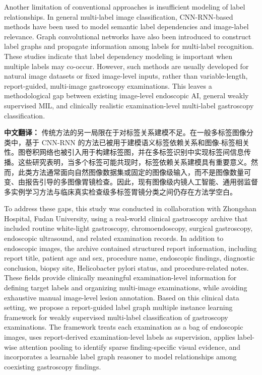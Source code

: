 \documentclass[Afour,sagev,times]{sagej}
\begin{document}
Another limitation of conventional approaches is insufficient modeling of label relationships. In general multi-label image classification, CNN-RNN-based methods have been used to model semantic label dependencies and image-label relevance.\cite{R14} Graph convolutional networks have also been introduced to construct label graphs and propagate information among labels for multi-label recognition.\cite{R15} These studies indicate that label dependency modeling is important when multiple labels may co-occur. However, such methods are usually developed for natural image datasets or fixed image-level inputs, rather than variable-length, report-guided, multi-image gastroscopy examinations. This leaves a methodological gap between existing image-level endoscopic AI, general weakly supervised MIL, and clinically realistic examination-level multi-label gastroscopy classification.

\textbf{中文翻译：} 传统方法的另一局限在于对标签关系建模不足。在一般多标签图像分类中，基于 CNN-RNN 的方法已被用于建模语义标签依赖关系和图像-标签相关性。图卷积网络也被引入用于构建标签图，并在多标签识别中实现标签间信息传播。这些研究表明，当多个标签可能共现时，标签依赖关系建模具有重要意义。然而，此类方法通常面向自然图像数据集或固定的图像级输入，而不是图像数量可变、由报告引导的多图像胃镜检查。因此，现有图像级内镜人工智能、通用弱监督多实例学习方法与临床真实检查级多标签胃镜分类之间仍存在方法学空白。

To address these gaps, this study was conducted in collaboration with Zhongshan Hospital, Fudan University, using a real-world clinical gastroscopy archive that included routine white-light gastroscopy, chromoendoscopy, surgical gastroscopy, endoscopic ultrasound, and related examination records. In addition to endoscopic images, the archive contained structured report information, including report title, patient age and sex, procedure name, endoscopic findings, diagnostic conclusion, biopsy site, Helicobacter pylori status, and procedure-related notes. These fields provide clinically meaningful examination-level information for defining target labels and organizing multi-image examinations, while avoiding exhaustive manual image-level lesion annotation. Based on this clinical data setting, we propose a report-guided label graph multiple instance learning framework for weakly supervised multi-label classification of gastroscopy examinations. The framework treats each examination as a bag of endoscopic images, uses report-derived examination-level labels as supervision, applies label-wise attention pooling to identify sparse finding-specific visual evidence, and incorporates a learnable label graph reasoner to model relationships among coexisting gastroscopy findings.
\end{document}
